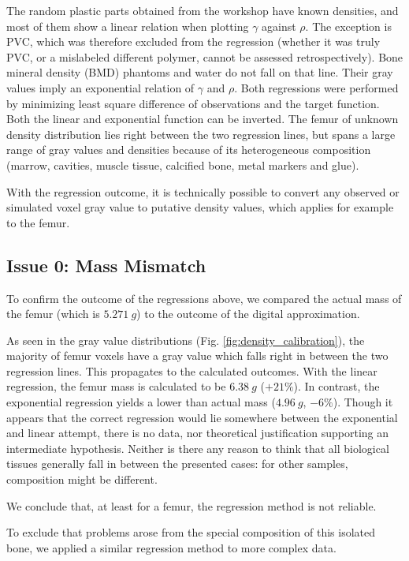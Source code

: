 The random plastic parts obtained from the workshop have known densities, and most of them show a linear relation when plotting \(\gamma\) against \(\rho\).
The exception is PVC, which was therefore excluded from the regression (whether it was truly PVC, or a mislabeled different polymer, cannot be assessed retrospectively).
Bone mineral density (BMD) phantoms and water do not fall on that line.
Their gray values imply an exponential relation of \(\gamma\) and \(\rho\).
Both regressions were performed by minimizing least square difference of observations and the target function.
Both the linear and exponential function can be inverted.
The femur of unknown density distribution lies right between the two regression lines, but spans a large range of gray values and densities because of its heterogeneous composition (marrow, cavities, muscle tissue, calcified bone, metal markers and glue).

With the regression outcome, it is technically possible to convert any observed or simulated voxel gray value to putative density values, which applies for example to the femur.


\subsection{Issue 0: Mass Mismatch}
\label{sec:org5fb6775}

To confirm the outcome of the regressions above, we compared the actual mass of the femur (which is \(5.271\ g\)) to the outcome of the digital approximation.

As seen in the gray value distributions (Fig. \ref{fig:density_calibration}), the majority of femur voxels have a gray value which falls right in between the two regression lines.
This propagates to the calculated outcomes.
With the linear regression, the femur mass is calculated to be \(6.38\ g\) (\(+21 \%\)).
In contrast, the exponential regression yields a lower than actual mass (\(4.96\ g\), \(-6 \%\)).
Though it appears that the correct regression would lie somewhere between the exponential and linear attempt, there is no data, nor theoretical justification supporting an intermediate hypothesis.
Neither is there any reason to think that all biological tissues generally fall in between the presented cases: for other samples, composition might be different.

We conclude that, at least for a femur, the regression method is not reliable.

\bigskip
To exclude that problems arose from the special composition of this isolated bone, we applied a similar regression method to more complex data.

